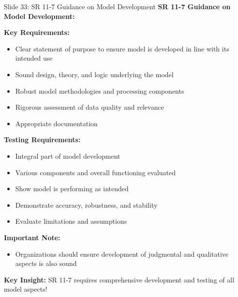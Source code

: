 \documentclass[8pt]{beamer}
\begin{document}
	\begin{frame}{Slide 33: SR 11-7 Guidance on Model Development}
		\fontsize{6.5}{7.5}\selectfont
		\textbf{SR 11-7 Guidance on Model Development:}
		
		\vspace{0.1cm}
		\textbf{Key Requirements:}
		\begin{itemize}
			\item Clear statement of purpose to ensure model is developed in line with its intended use
			\item Sound design, theory, and logic underlying the model
			\item Robust model methodologies and processing components
			\item Rigorous assessment of data quality and relevance
			\item Appropriate documentation
		\end{itemize}
		
		\vspace{0.1cm}
		\textbf{Testing Requirements:}
		\begin{itemize}
			\item Integral part of model development
			\item Various components and overall functioning evaluated
			\item Show model is performing as intended
			\item Demonstrate accuracy, robustness, and stability
			\item Evaluate limitations and assumptions
		\end{itemize}
		
		\vspace{0.1cm}
		\textbf{Important Note:}
		\begin{itemize}
			\item Organizations should ensure development of judgmental and qualitative aspects is also sound
		\end{itemize}
		
		\textcolor{myblue}{\textbf{Key Insight:}} SR 11-7 requires \textcolor{myblue}{comprehensive development and testing of all model aspects}!
	\end{frame}
	
\end{document}
